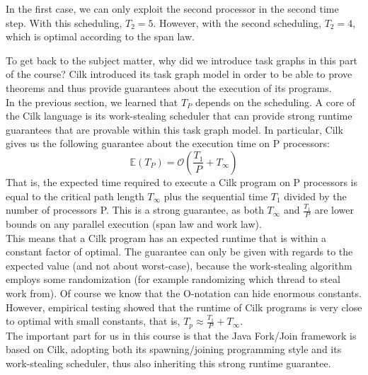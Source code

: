 \documentclass[main.tex]{subfiles}
\begin{document}
\noindent In the first case, we can only exploit the second processor in the second time step. With this scheduling, \(T_{2}=5\). However, with the second scheduling, \(T_{2}=4\), which is optimal according to the span law.

To get back to the subject matter, why did we introduce task graphs in this part of the course? Cilk introduced its task graph model in order to be able to prove theorems and thus provide guarantees about the execution of its programs.\\
In the previous section, we learned that \(T_{P}\) depends on the scheduling. A core of the Cilk language is its work-stealing scheduler that can provide strong runtime guarantees that are provable within this task graph model. In particular, Cilk gives us the following guarantee about the execution time on P processors:
$$\mathbb{E}(T_{P})=\mathcal{O}(\frac{T_{1}}{P} + T_{\infty})$$
\noindent That is, the expected time required to execute a Cilk program on P processors is equal to the critical path length \(T_{\infty}\) plus the sequential time \(T_{1}\) divided by the number of processors P. This is a strong guarantee, as both \(T_{\infty}\) and \(\frac{T_{1}}{P}\) are lower bounds on any parallel execution (span law and work law).\\
This means that a Cilk program has an expected runtime that is within a constant factor of optimal. The guarantee can only be given with regards to the expected value (and not about worst-case), because the work-stealing algorithm employs some randomization (for example randomizing which thread to steal work from). Of course we know that the O-notation can hide enormous constants. However, empirical testing showed that the runtime of Cilk programs is very close to optimal with small constants, that is, \(T_{p}\approx \frac{T_{1}}{P}+T_{\infty}\).\\
The important part for us in this course is that the Java Fork/Join framework is based on Cilk, adopting both its spawning/joining programming style and its work-stealing scheduler, thus also inheriting this strong runtime guarantee.
\end{document}
